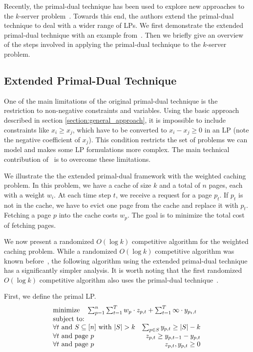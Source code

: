 Recently, the primal-dual technique has been used to explore new approaches to the $k$-server problem~\cite{bansal10:k-server}.
Towards this end, the authors extend the primal-dual technique to deal with a wider range of LPs.
We first demonstrate the extended primal-dual technique with an example from~\cite{bansal10:k-server}.
Then we briefly give an overview of the steps involved in applying the primal-dual technique to the $k$-server problem.

\subsection{Extended Primal-Dual Technique}
One of the main limitations of the original primal-dual technique is the restriction to non-negative constraints and variables.
Using the basic approach described in section \ref{section:general_approach}, it is impossible to include constraints like $x_i \geq x_j$, which have to be converted to $x_i - x_j \geq 0$ in an LP (note the negative coefficient of $x_j$).
This condition restricts the set of problems we can model and makes some LP formulations more complex.
The main technical contribution of~\cite{bansal10:k-server} is to overcome these limitations.

We illustrate the the extended primal-dual framework with the weighted caching problem.
In this problem, we have a cache of size $k$ and a total of $n$ pages, each with a weight $w_i$.
At each time step $t$, we receive a request for a page $p_t$.
If $p_t$ is not in the cache, we have to evict one page from the cache and replace it with $p_t$.
Fetching a page $p$ into the cache costs $w_p$.
The goal is to minimize the total cost of fetching pages.

We now present a randomized $O(\log k)$ competitive algorithm for the weighted caching problem.
While a randomized $O(\log k)$ competitive algorithm was known before~\cite{bansal10:k-server}, the following algorithm using the extended primal-dual technique has a significantly simpler analysis.
It is worth noting that the first randomized $O(\log k)$ competitive algorithm also uses the primal-dual technique~\cite{bansal07:weighted-paging}.

First, we define the primal LP.
\[
\begin{array}{lr}
  \multicolumn{2}{l}{\textrm{minimize} \quad  \sum_{p=1}^n\sum_{t=1}^T w_p \cdot z_{p,t} + \sum_{t=1}^T \infty \cdot y_{p_t,t}} \\
  \textrm{subject to:} & \\
  \forall t \textrm{ and } S \subseteq [n] \textrm{ with }|S| > k & \sum_{p\in S} y_{p,t} \geq |S| - k \\
  \forall t \textrm { and page } p & z_{p,t} \geq y_{p,t-1} - y_{p,t} \\
  \forall t \textrm { and page } p & z_{p,t}, y_{p,t} \geq 0 \\
\end{array}
\]

